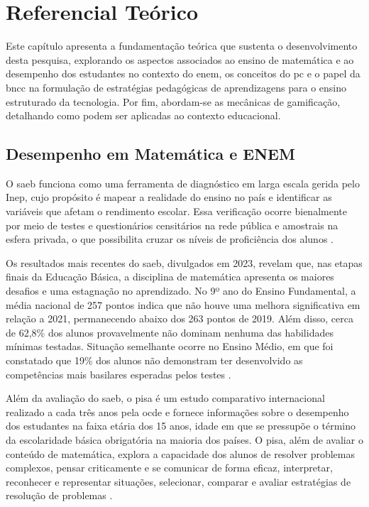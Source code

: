 
\setlength{\parskip}{0.3cm}


\chapter{Referencial Teórico}
\label{ch:fundamentacao}


Este capítulo apresenta a fundamentação teórica que sustenta o desenvolvimento
desta pesquisa, explorando os aspectos associados ao ensino de matemática e ao
desempenho dos estudantes no contexto do \gls{enem}, os conceitos do \gls{pc} e o papel da
\gls{bncc} na formulação de estratégias pedagógicas de aprendizagens para o
ensino estruturado da tecnologia. Por fim, abordam-se as mecânicas de
gamificação, detalhando como podem ser aplicadas ao contexto educacional.


\section{Desempenho em Matemática e ENEM}
O \gls{saeb} funciona como uma ferramenta de
diagnóstico em larga escala gerida pelo Inep, cujo propósito é mapear a
realidade do ensino no país e identificar as variáveis que afetam o rendimento
escolar. Essa verificação ocorre bienalmente por meio de testes e questionários
censitários na rede pública e amostrais na esfera privada, o que possibilita
cruzar os níveis de proficiência dos alunos \cite{brasil2026saeb}.


Os resultados mais recentes do \gls{saeb}, divulgados em 2023, revelam que, nas etapas
finais da Educação Básica, a disciplina de matemática apresenta os maiores desafios e
uma estagnação no aprendizado. No 9º ano do Ensino Fundamental, a média nacional
de 257 pontos indica que não houve uma melhora significativa em relação a 2021,
permanecendo abaixo dos 263 pontos de 2019. Além disso, cerca de 62,8\% dos alunos
provavelmente não dominam nenhuma das habilidades mínimas testadas. Situação
semelhante ocorre no Ensino Médio, em que foi constatado que 19\% dos alunos não demonstram
ter desenvolvido as competências mais basilares esperadas pelos testes \cite{brasil2026saeb}.


Além da avaliação do \gls{saeb}, o \gls{pisa} é um estudo comparativo internacional realizado a cada três anos pela
\gls{ocde} e fornece
informações sobre o desempenho dos estudantes na faixa etária dos 15 anos, idade
em que se pressupõe o término da escolaridade básica obrigatória na maioria dos
países. O \gls{pisa}, além de avaliar o conteúdo de matemática, explora a
capacidade dos alunos de resolver problemas complexos, pensar criticamente e se
comunicar de forma eficaz, interpretar, reconhecer e representar situações,
selecionar, comparar e avaliar estratégias de resolução de problemas
\cite{brasil2026pisa}.


